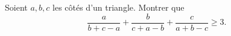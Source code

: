 Soient $a, b, c$ les côtés d'un triangle. Montrer que
\[ \frac{a}{b + c - a} + \frac{b}{c + a - b} + \frac{c}{a + b - c} \geq 3. \]
